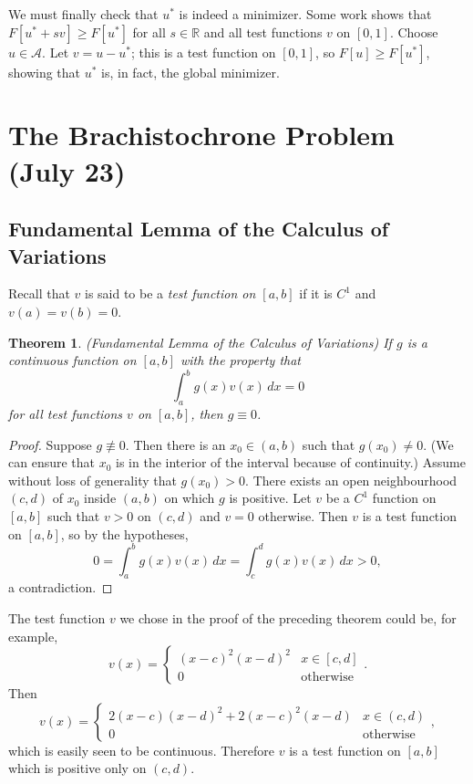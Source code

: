 \documentclass[11pt]{article}
\newcommand{\R}{\mathbb{R}}
\newtheorem{theorem}{Theorem}[subsection]
\begin{document}
We must finally check that $u^*$ is indeed a minimizer. Some work shows that $F[u^* + sv] \geq F[u^*]$ for all $s \in \R$ and all test functions $v$ on $[0,1]$. Choose $u \in \mathcal{A}$. Let $v = u-u^*$; this is a test function on $[0,1]$, so $F[u] \geq F[u^*]$, showing that $u^*$ is, in fact, the global minimizer.

\newpage

\section{The Brachistochrone Problem (July 23)}

\subsection{Fundamental Lemma of the Calculus of Variations}

Recall that $v$ is said to be a \emph{test function on $[a,b]$} if it is $C^1$ and $v(a) = v(b) = 0$.

\begin{theorem}
(Fundamental Lemma of the Calculus of Variations) If $g$ is a continuous function on $[a,b]$ with the property that
\[
\int_a^b g(x)v(x) \, dx = 0
\]
for all test functions $v$ on $[a,b]$, then $g \equiv 0$.
\end{theorem}
\begin{proof}
Suppose $g\not\equiv 0$. Then there is an $x_0 \in (a,b)$ such that $g(x_0) \neq 0$. (We can ensure that $x_0$ is in the interior of the interval because of continuity.) Assume without loss of generality that $g(x_0) > 0$. There exists an open neighbourhood $(c,d)$ of $x_0$ inside $(a,b)$ on which $g$ is positive. Let $v$ be a $C^1$ function on $[a,b]$ such that $v > 0$ on $(c,d)$ and $v = 0$ otherwise. Then $v$ is a test function on $[a,b]$, so by the hypotheses,
\[
0 = \int_a^b g(x)v(x) \, dx = \int_c^d g(x)v(x) \, dx > 0,
\]
a contradiction.
\end{proof}
The test function $v$ we chose in the proof of the preceding theorem could be, for example,	
\[
v(x) = \begin{cases} 
(x-c)^2(x-d)^2 & x \in [c,d] \\
0 & \text{otherwise}
\end{cases}.
\]
Then
\[
v(x) = \begin{cases} 
2(x-c)(x-d)^2 + 2(x-c)^2(x-d) & x \in (c,d) \\
0 & \text{otherwise}
\end{cases},
\]
which is easily seen to be continuous. Therefore $v$ is a test function on $[a,b]$ which is positive only on $(c,d)$.
\end{document}
